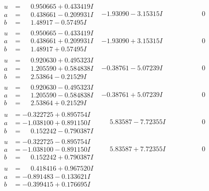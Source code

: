 \documentclass[1p]{elsarticle_modified}
\theoremstyle{definition}
\begin{document}
$$\begin{array}{c|c|c}
\begin{aligned}
u &= \phantom{-}0.950665 + 0.433419 I \\
a &= \phantom{-}0.438661 - 0.209931 I \\
b &= \phantom{-}1.48917 - 0.57495 I\end{aligned}
 & -1.93090 - 3.15315 I & \phantom{-0.000000 } 0 \\ \hline\begin{aligned}
u &= \phantom{-}0.950665 - 0.433419 I \\
a &= \phantom{-}0.438661 + 0.209931 I \\
b &= \phantom{-}1.48917 + 0.57495 I\end{aligned}
 & -1.93090 + 3.15315 I & \phantom{-0.000000 } 0 \\ \hline\begin{aligned}
u &= \phantom{-}0.920630 + 0.495323 I \\
a &= \phantom{-}1.205590 + 0.584838 I \\
b &= \phantom{-}2.53864 - 0.21529 I\end{aligned}
 & -0.38761 - 5.07239 I & \phantom{-0.000000 } 0 \\ \hline\begin{aligned}
u &= \phantom{-}0.920630 - 0.495323 I \\
a &= \phantom{-}1.205590 - 0.584838 I \\
b &= \phantom{-}2.53864 + 0.21529 I\end{aligned}
 & -0.38761 + 5.07239 I & \phantom{-0.000000 } 0 \\ \hline\begin{aligned}
u &= -0.322725 + 0.895754 I \\
a &= -1.038100 + 0.891150 I \\
b &= \phantom{-}0.152242 - 0.790387 I\end{aligned}
 & \phantom{-}5.83587 - 7.72355 I & \phantom{-0.000000 } 0 \\ \hline\begin{aligned}
u &= -0.322725 - 0.895754 I \\
a &= -1.038100 - 0.891150 I \\
b &= \phantom{-}0.152242 + 0.790387 I\end{aligned}
 & \phantom{-}5.83587 + 7.72355 I & \phantom{-0.000000 } 0 \\ \hline\begin{aligned}
u &= \phantom{-}0.418416 + 0.967520 I \\
a &= -0.891483 - 0.133621 I \\
b &= -0.399415 + 0.176695 I\end{aligned}

\end{array}$$
\end{document}
